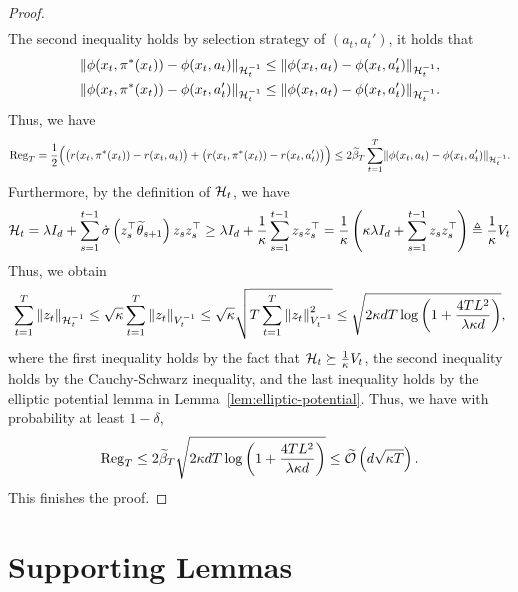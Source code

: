 \begin{proof}
\begin{align*}
    \end{align*}
    The second inequality holds by selection strategy of $(a_t, a_t')$, it holds that
    \begin{align*}
        \lVert\phi(x_t, \pi^*(x_t)) - \phi(x_t, a_t)\rVert_{\mathcal{H}_t^{-1}} & \leq \lVert\phi(x_t, a_t) - \phi(x_t, a_t')\rVert_{\mathcal{H}_t^{-1}},\\
        \lVert\phi(x_t, \pi^*(x_t)) - \phi(x_t, a'_t)\rVert_{\mathcal{H}_t^{-1}} & \leq \lVert\phi(x_t, a_t) - \phi(x_t, a_t')\rVert_{\mathcal{H}_t^{-1}}.
    \end{align*}
    Thus, we have
    \begin{align*}
      {\operatorname*{Reg}}_T  = \frac{1}{2} \Big(\big(r(x_t, \pi^*(x_t)) - r(x_t, a_t)\big) + \big(r(x_t, \pi^*(x_t)) - r(x_t, a_t')\big)\Big) \leq 2 \widetilde{\beta}_T \sum_{t=1}^T \lVert\phi(x_t, a_t) - \phi(x_t, a_t')\rVert_{\mathcal{H}_t^{-1}}.
    \end{align*}
    Furthermore, by the definition of $\mathcal{H}_t$, we have
   \begin{align*}
    \mathcal{H}_t = \lambda I_d + \sum_{s=1}^{t-1} \dot{\sigma}\left(z_s^{\top} \widetilde{\theta}_{s+1}\right) z_s z_s^{\top} \geq \lambda I_d + \frac{1}{\kappa} \sum_{s=1}^{t-1} z_s z_s^{\top} = \frac{1}{\kappa}\left(\kappa \lambda I_d + \sum_{s=1}^{t-1} z_s z_s^{\top}\right) \triangleq \frac{1}{\kappa} V_t
    \end{align*}
    Thus, we obtain
   \begin{align*}
    \sum_{t=1}^T\left\|z_t\right\|_{\mathcal{H}_t^{-1}} \leq \sqrt{\kappa} \sum_{t=1}^T\left\|z_t\right\|_{V_t^{-1}} \leq \sqrt{\kappa} \sqrt{T \sum_{t=1}^T\left\|z_t\right\|^2_{V_t^{-1}}} \leq \sqrt{2 \kappa d T \log \left(1+\frac{4TL^2}{\lambda \kappa d}\right)},
  \end{align*}
  where the first inequality holds by the fact that $\mathcal{H}_t \succeq \frac{1}{\kappa} V_t$, the second inequality holds by the Cauchy-Schwarz inequality, and the last inequality holds by the elliptic potential lemma in Lemma~\ref{lem:elliptic-potential}.
  Thus, we have with probability at least $1-\delta$,
  \begin{align*}
    {\operatorname*{Reg}}_T \leq 2{\widetilde{\beta}_T} \sqrt{2 \kappa d T \log \left(1+\frac{4TL^2}{\lambda \kappa d}\right)} \leq \widetilde{\mathcal{O}} \left(d\sqrt{{\kappa}{T}}\right).
  \end{align*}
  This finishes the proof.
\end{proof}


\section{Supporting Lemmas}

